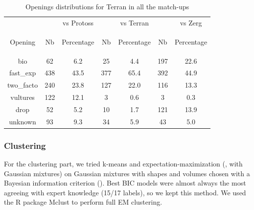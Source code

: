 \begin{table}[h]
\caption{Openings distributions for Terran in all the match-ups}
\begin{center}
\begin{tabular}{|c|cc|cc|cc|}
\hline
&  & vs Protoss &  & vs Terran &  & vs Zerg \\
Opening
& Nb
& \begin{scriptsize}Percentage\end{scriptsize}
& Nb
& \begin{scriptsize}Percentage\end{scriptsize}
& Nb
& \begin{scriptsize}Percentage\end{scriptsize} \\ \hline
bio 	    & 62 	& 6.2 	& 25 	& 4.4   & 197 	& 22.6 \\
fast\_exp 	& 438 	& 43.5 	& 377 	& 65.4  & 392 	& 44.9 \\
two\_facto 	& 240 	& 23.8  & 127 	& 22.0  & 116 	& 13.3 \\
vultures 	& 122 	& 12.1  & 3 	& 0.6   & 3 	& 0.3  \\
drop 	    & 52 	& 5.2   & 10 	& 1.7   & 121 	& 13.9 \\
unknown 	& 93 	& 9.3   & 34 	& 5.9   & 43 	& 5.0 \\ \hline
\end{tabular}
\label{tab:openings_distrib}
\end{center}
\end{table}


\subsubsection{Clustering}

For the clustering part, we tried k-means and expectation-maximization (, with Gaussian mixtures) on Gaussian mixtures with shapes and volumes chosen with a Bayesian information criterion (). Best BIC models were almost always the most agreeing with expert knowledge (15/17 labels), so we kept this method. We used the R package Mclust \citep{Mclust,Mclust2} to perform full EM clustering. 

